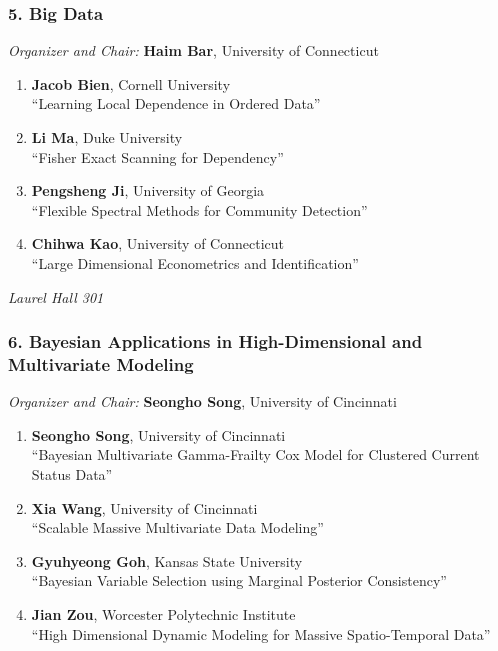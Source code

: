 \subsubsection*{5. Big Data}

\emph{Organizer and Chair:} \textbf{Haim Bar}, University of Connecticut

\begin{enumerate}
\item \textbf{Jacob Bien}, Cornell University \\
``Learning Local Dependence in Ordered Data''
\item \textbf{Li Ma}, Duke University \\
``Fisher Exact Scanning for Dependency''
\item \textbf{Pengsheng Ji}, University of Georgia \\
``Flexible Spectral Methods for Community Detection''
\item \textbf{Chihwa Kao}, University of Connecticut \\
``Large Dimensional Econometrics and Identification''
\end{enumerate}

\emph{Laurel Hall 301} \\[.5em]

\subsubsection*{6. Bayesian Applications in High-Dimensional and Multivariate Modeling}

\emph{Organizer and Chair:} \textbf{Seongho Song}, University of Cincinnati

\begin{enumerate}
\item \textbf{Seongho Song}, University of Cincinnati \\
``Bayesian Multivariate Gamma-Frailty Cox Model for Clustered Current Status Data''
\item \textbf{Xia Wang}, University of Cincinnati \\
``Scalable Massive Multivariate Data Modeling''
\item \textbf{Gyuhyeong Goh}, Kansas State University \\
``Bayesian Variable Selection using Marginal Posterior Consistency''
\item \textbf{Jian Zou}, Worcester Polytechnic Institute \\
``High Dimensional Dynamic Modeling for Massive Spatio-Temporal Data''
\end{enumerate}

